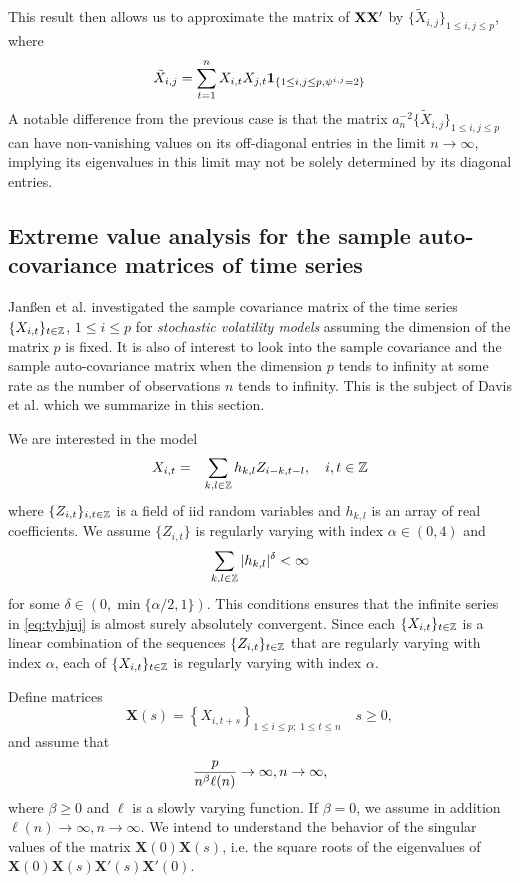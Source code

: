 This result then allows us to approximate the matrix of $\mathbf{XX'}$
by
$\{\tilde X_{i,j}\}_{1 \leq i,j \leq p}$, where
\[
\tilde X_{i,j} = \sum_{t=1}^n X_{i,t} X_{j,t}
\mathbf{1}_{\{1 \leq i,j \leq p, \psi^{i,j} = 2\}}
\]
A notable difference from the previous case is that the matrix
$a_{n}^{-2}\{\tilde X_{i,j}\}_{1 \leq i,j \leq p}$ can have non-vanishing
values on its off-diagonal entries in the limit
$n \to \infty$, implying its eigenvalues in this limit may not be
solely determined by its diagonal entries.

\subsection{Extreme value analysis for the sample auto-covariance
  matrices of time series}
Jan\ss en et al. \cite{janssen:mikosch:rezapour:xie:2016} investigated
the sample covariance matrix of the time series
$\{X_{i,t}\}_{t \in \mathbb Z}$, $1 \leq i \leq p$ for
{\em stochastic volatility models} assuming the dimension
of the matrix $p$ is fixed. It is also of interest to look into the
sample covariance and the sample auto-covariance matrix when the dimension
$p$ tends to infinity at some rate as the number of observations $n$ tends
to infinity. This is the subject of Davis et al.
\cite{davis:mikosch:heiny:xie:2015} which we summarize in this section.

We are interested in the model
\begin{eqnarray}
  X_{i,t} &=& \sum_{k,l \in \mathbb Z} h_{k,l} Z_{i-k, t-l},
  \quad i,t \in \mathbb Z \label{eq:tyhjuj}
\end{eqnarray}
where $\{Z_{i,t}\}_{i,t \in \mathbb Z}$ is a field of iid random
variables and $h_{k,l}$ is an array of real coefficients. We
assume $\{Z_{i,t}\}$ is regularly varying with index
$\alpha \in (0, 4)$ and
\[
\sum_{k,l \in \mathbb Z} |h_{k,l}|^\delta < \infty
\]
for some $\delta \in (0, \min\{\alpha/2, 1\})$. This conditions ensures
that the infinite series in \eqref{eq:tyhjuj} is almost surely
absolutely convergent. Since each $\{X_{i,t}\}_{t \in \mathbb Z}$
is a linear combination of the sequences $\{Z_{i,t}\}_{t \in \mathbb Z}$
that are regularly varying with index $\alpha$, each of
$\{X_{i,t}\}_{t \in \mathbb Z}$ is regularly varying with index $\alpha$.

Define matrices
\[
\mathbf X(s) = \left\{X_{i, t+s}\right\}_{1 \leq i \leq p;\; 1 \leq t \leq n}
\quad
s \geq 0,
\]
and assume that
\[
{p \over n^\beta \ell(n)} \to \infty, n \to \infty,
\]
where $\beta \geq 0$ and $\ell$ is a slowly varying function.
If $\beta = 0$, we assume in addition $\ell(n) \to \infty, n\to\infty$.
We intend to understand the behavior of the singular values of the
matrix $\mathbf X(0) \mathbf X(s)$, i.e. the square roots of the
eigenvalues of
$\mathbf X(0) \mathbf X(s) \mathbf X'(s) \mathbf X'(0)$.

